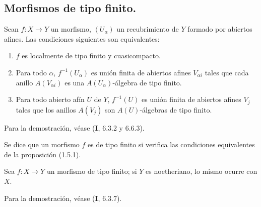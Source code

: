 \subsection{Morfismos de tipo finito.}
\label{subsection:IV.1.5-fr}

\begin{proposition}[1.5.1]
\label{IV.1.5.1-fr}
Sean $f:X\to Y$ un morfismo, $(U_\alpha)$ un recubrimiento de $Y$ formado
por abiertos afines. Las condiciones siguientes son equivalentes:
\begin{enumerate}
  \item[\textup{a)}] $f$ es localmente de tipo finito y cuasicompacto.
  \item[\textup{b)}] Para todo $\alpha$, $f^{-1}(U_\alpha)$ es unión finita de abiertos
  afines $V_{\alpha i}$ tales que cada anillo $A(V_{\alpha i})$ es una
  $A(U_\alpha)$-álgebra de tipo finito.
  \item[\textup{c)}] Para todo abierto afín $U$ de $Y$, $f^{-1}(U)$ es unión finita
  de abiertos afines $V_j$ tales que los anillos $A(V_j)$ son
  $A(U)$-álgebras de tipo finito.
\end{enumerate}
\end{proposition}

Para la demostración, véase (\textbf{I}, 6.3.2 y 6.6.3).

\begin{definition}[1.5.2]
\label{IV.1.5.2-fr}
Se dice que un morfismo $f$ es de tipo finito si verifica las condiciones
equivalentes de la proposición \textup{(1.5.1)}.
\end{definition}


\begin{proposition}[1.5.3]
\label{IV.1.5.3-fr}
Sea $f:X\to Y$ un morfismo de tipo finito; si $Y$ es noetheriano, lo mismo
ocurre con $X$.
\end{proposition}

Para la demostración, véase (\textbf{I}, 6.3.7).

